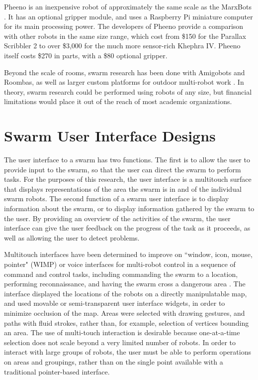 Pheeno is an inexpensive robot of approximately the same scale as the MarxBots \citep{wilson2016pheeno}.
It has an optional gripper module, and uses a Raspberry Pi miniature computer for its main processing power. 
The developers of Pheeno provide a comparison with other robots in the same size range, which cost from \$150 for the Parallax Scribbler 2 to over \$3,000 for the much more sensor-rich Khephra IV. 
Pheeno itself costs \$270 in parts, with a \$80 optional gripper. 

Beyond the scale of rooms, swarm research has been done with Amigobots and Roombas, as well as larger custom platforms for outdoor multi-robot work \citep{guo2007bio, tammet2008rfid, olson2013cacm}.
In theory, swarm research could be performed using robots of any size, but financial limitations would place it out of the reach of most academic organizations. 


\section{Swarm User Interface Designs} \label{section:Swarm_User_Interface_Designs}

The user interface to a swarm has two functions. 
The first is to allow the user to provide input to the swarm, so that the user can direct the swarm to perform tasks. 
For the purposes of this research, the user interface is a multitouch surface that displays representations of the area the swarm is in and of the individual swarm robots. 
The second function of a swarm user interface is to display information about the swarm, or to display information gathered by the swarm to the user. 
By providing an overview of the activities of the swarm, the user interface can give the user feedback on the progress of the task as it proceeds, as well as allowing the user to detect problems. 

Multitouch interfaces have been determined to improve on ``window, icon, mouse, pointer" (WIMP) or voice interfaces for multi-robot control in a sequence of command and control tasks, including commanding the swarm to a location, performing reconnaissance, and having the swarm cross a dangerous area \citep{hayes2010multi}.
The interface displayed the locations of the robots on a directly manipulatable map, and used movable or semi-transparent user interface widgets, in order to minimize occlusion of the map. 
Areas were selected with drawing gestures, and paths with fluid strokes, rather than, for example, selection of vertices bounding an area.
The use of multi-touch interaction is desirable because one-at-a-time selection does not scale beyond a very limited number of robots.
In order to interact with large groups of robots, the user must be able to perform operations on areas and groupings, rather than on the single point available with a traditional pointer-based interface. 

